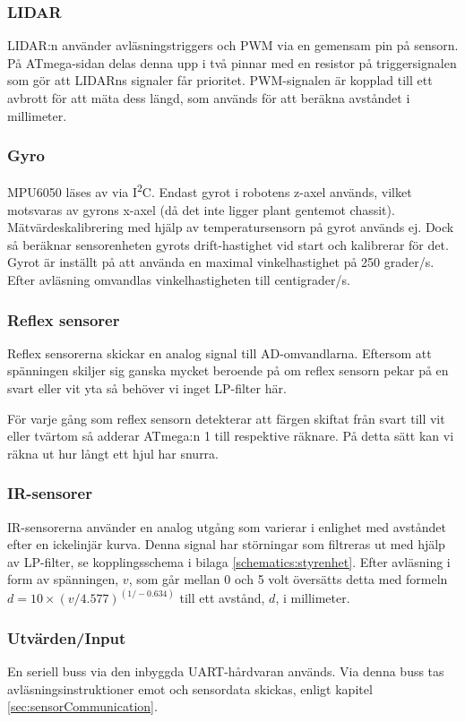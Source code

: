 \documentclass[a4paper,11pt]{article}
\begin{document}
\subsubsection{LIDAR}
LIDAR:n använder avläsningstriggers och PWM via en gemensam pin på sensorn. På ATmega-sidan delas denna upp i två pinnar med en resistor på triggersignalen som gör att LIDARns signaler får prioritet. PWM-signalen är kopplad till ett avbrott för att mäta dess längd, som används för att beräkna avståndet i millimeter.

\subsubsection{Gyro}
MPU6050 läses av via I\textsuperscript{2}C. Endast gyrot i robotens z-axel används, vilket motsvaras av gyrons x-axel (då det inte ligger plant gentemot chassit). Mätvärdeskalibrering med hjälp av temperatursensorn på gyrot används ej. Dock så beräknar sensorenheten gyrots drift-hastighet vid start och kalibrerar för det. Gyrot är inställt på att använda en maximal vinkelhastighet på 250 grader/s. Efter avläsning omvandlas vinkelhastigheten till centigrader/s.

\subsubsection{Reflex sensorer}
Reflex sensorerna skickar en analog signal till AD-omvandlarna. Eftersom att spänningen skiljer sig ganska mycket beroende på om reflex sensorn pekar på en svart eller vit yta så behöver vi inget LP-filter här.

För varje gång som reflex sensorn detekterar att färgen skiftat från svart till vit eller tvärtom så adderar ATmega:n 1 till respektive räknare. På detta sätt kan vi räkna ut hur långt ett hjul har snurra.

\subsubsection{IR-sensorer}
\label{ssec:ir_interface}
IR-sensorerna använder en analog utgång som varierar i enlighet med avståndet efter en ickelinjär kurva. Denna signal har störningar som filtreras ut med hjälp av LP-filter, se kopplingsschema i bilaga \ref{schematics:styrenhet}. Efter avläsning i form av spänningen, $v$, som går mellan 0 och 5 volt översätts detta med formeln $d = 10 \times (v/4.577) ^{(1/-0.634)}$ till ett avstånd, $d$, i millimeter.

\subsubsection{Utvärden/Input}
En seriell buss via den inbyggda UART-hårdvaran används. Via denna buss tas avläsningsinstruktioner emot och sensordata skickas, enligt kapitel \ref{sec:sensorCommunication}.
\end{document}
